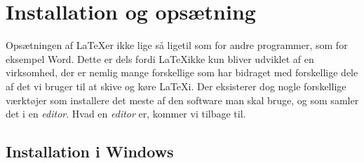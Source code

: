\section{Installation og opsætning}
Opsætningen af \LaTeX er ikke lige så ligetil som for andre programmer, som for eksempel Word.
Dette er dels fordi \LaTeX ikke kun bliver udviklet af en virksomhed,
der er nemlig mange forskellige som har bidraget med forskellige dele af det vi bruger til at skive og køre \LaTeX i.
Der eksisterer dog nogle forskellige værktøjer som installere det meste af den software man skal bruge,
og som samler det i en \textit{editor}.
Hvad en \textit{editor} er, kommer vi tilbage til.

\subsection{Installation i Windows}

\pagebreak
